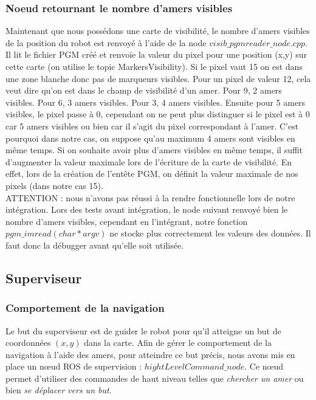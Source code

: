 \documentclass[10pt,a4paper]{article}
\begin{document}
\subsubsection{Noeud retournant le nombre d'amers visibles}
Maintenant que nous possédons une carte de visibilité, le nombre d'amers visibles de la position du robot est renvoyé à l'aide de la node $visib\_pgmreader\_node.cpp$. Il lit le fichier PGM créé et renvoie la valeur du pixel pour une position (x,y) sur cette carte (on utilise le topic MarkersVisibility). Si le pixel vaut 15 on est dans une zone blanche donc pas de marqueurs visibles. Pour un pixel de valeur 12, cela veut dire qu'on est dans le champ de visibilité d'un amer. Pour 9, 2 amers visibles. Pour 6, 3 amers visibles. Pour 3, 4 amers visibles. Ensuite pour 5 amers visibles, le pixel passe à 0, cependant on ne peut plus distinguer si le pixel est à 0 car 5 amers visibles ou bien car il s'agit du pixel correspondant à l'amer. C'est pourquoi dans notre cas, on suppose qu'au maximum 4 amers sont visibles en même temps. 
Si on souhaite avoir plus d'amers visibles en même temps, il suffit d'augmenter la valeur maximale lors de l’écriture de la carte de visibilité. En effet, lors de la création de l’entête PGM, on définit la valeur maximale de nos pixels (dans notre cas 15).\\

ATTENTION : nous n'avons pas réussi à la rendre fonctionnelle lors de notre intégration. Lors des tests avant intégration, le node suivant renvoyé bien le nombre d'amers visibles, cependant en l'intégrant, notre fonction $pgm\_imread(char *argv)$ ne stocke plus correctement les valeurs des données. Il faut donc la débugger avant qu'elle soit utilisée.

\newpage
\subsection{Superviseur}
\label{sec:Superviseur}

\subsubsection{Comportement de la navigation}

Le but du superviseur est de guider le robot pour qu'il atteigne un but de coordonnées $(x,y)$ dans la carte. Afin de gérer le comportement de la navigation à l'aide des amers, pour atteindre ce but précis, nous avons mis en place un nœud ROS de supervision : $hightLevelCommand\_node$. Ce nœud permet d'utiliser des commandes de haut niveau telles que \textit{chercher un amer} ou bien \textit{se déplacer vers un but}.\\
\end{document}
